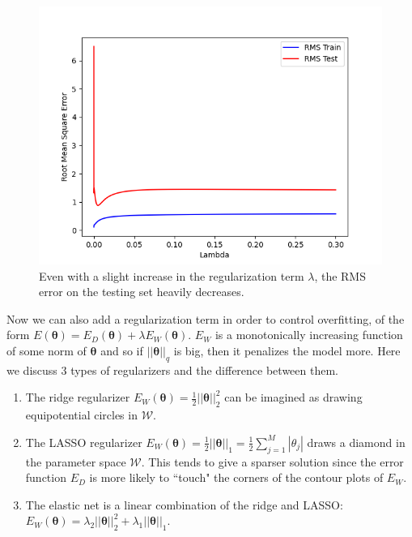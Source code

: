 \documentclass{article}
\theoremstyle{definition}
\begin{document}
      \begin{figure}[hbt!]
        \centering
        \includegraphics[scale=0.5]{img/Lambda_vs_RMS.png}
        \caption{Even with a slight increase in the regularization term $\lambda$, the RMS error on the testing set heavily decreases. }
        \label{fig:enter-label}
      \end{figure}

      Now we can also add a regularization term in order to control overfitting, of the form $E(\boldsymbol{\theta}) = E_D (\boldsymbol{\theta}) + \lambda E_W (\boldsymbol{\theta})$. $E_W$ is a monotonically increasing function of some norm of $\boldsymbol{\theta}$ and so if $||\boldsymbol{\theta}||_q$ is big, then it penalizes the model more. Here we discuss 3 types of regularizers and the difference between them. 

      \begin{enumerate}
        \item The ridge regularizer $E_W (\boldsymbol{\theta}) = \frac{1}{2} ||\boldsymbol{\theta}||_2^2$ can be imagined as drawing equipotential circles in $\mathcal{W}$. 

        \item The LASSO regularizer $E_W (\boldsymbol{\theta}) = \frac{1}{2} ||\boldsymbol{\theta}||_1 = \frac{1}{2} \sum_{j=1}^M |\theta_j|$ draws a diamond in the parameter space $\mathcal{W}$. This tends to give a sparser solution since the error function $E_D$ is more likely to ``touch" the corners of the contour plots of $E_W$. 

        \item The elastic net is a linear combination of the ridge and LASSO: $E_W (\boldsymbol{\theta}) = \lambda_2 ||\boldsymbol{\theta}||_2^2 + \lambda_1 ||\boldsymbol{\theta}||_1$. 
      \end{enumerate}
\end{document}

